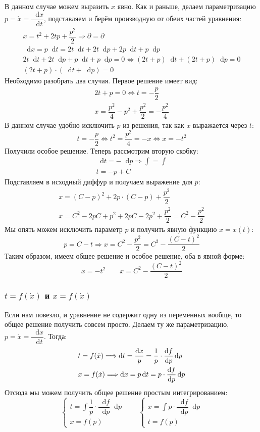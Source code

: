 \documentclass[a4paper,12pt]{article}
\renewcommand*\d{\mathop{}\!\mathrm{d}}
\newcommand{\dx}{\dot{x}}
\newcommand{\bto}{\Longrightarrow}
\newcommand{\ds}{\displaystyle}
\begin{document}
В данном случае можем выразить $x$ явно. Как и раньше, делаем параметризацию $p = \dx = \dfrac{\d x}{\d t}$, подставляем и берём производную от обеих частей уравнения:
\begin{gather*}
	x = t^2 + 2tp + \dfrac{p^2}{2} \bto \partial = \partial\\
	\d x = p\d t = 2t\d t + 2t\d p + 2p\d t + p\d p\\
	2t \d t + 2t\d p + p\d t + p\d p = 0 \iff (2t + p)\d t + (2t + p)\d p = 0\\
	(2t + p)\cdot (\d t + \d p) = 0
\end{gather*}
Необходимо разобрать два случая. Первое решение имеет вид:
\begin{gather*}
	2t + p = 0 \iff t = -\dfrac{p}{2}\\
	x = \dfrac{p^2}{4} - p^2 + \dfrac{p^2}{2} = -\dfrac{p^2}{4}
\end{gather*}
В данном случае удобно исключить $p$ из решения, так как $x$ выражается через $t$:
\[
	t = -\dfrac{p}{2} \iff t^2 = \dfrac{p^2}{4} = -x \iff x = -t^2
\]
Получили особое решение. Теперь рассмотрим вторую скобку:
\begin{gather*}
	\d t = -\d p \bto \ds\int = \int\\
	t = -p + C
\end{gather*}
Подставляем  в исходный диффур и получаем выражение для $p$:
\begin{gather*}
	x = (C - p)^2 + 2p \cdot (C - p) + \dfrac{p^2}{2}\\
	x = C^2 - 2pC + p^2 + 2pC - 2p^2 + \dfrac{p^2}{2} = C^2 - \dfrac{p^2}{2}
\end{gather*}
Мы опять можем исключить параметр $p$ и получить явную функцию $x = x(t)$:
\[
	p = C - t \bto x = C^2 - \dfrac{p^2}{2} = C^2 - \dfrac{(C - t)^2}{2}
\]
Таким образом, имеем общее решение и особое решение, оба в явной форме:
\[x = -t^2 \qquad x = C^2 - \dfrac{(C - t)^2}{2}\]


\subsubsection{$t = f(\dx)$ и $x = f(\dx)$}

Если нам повезло, и уравнение не содержит одну из переменных вообще, то общее решение получить совсем просто. Делаем ту же параметризацию, $p = \dx = \dfrac{\d x}{\d t}$. Тогда:
\[\begin{gathered}
	t = f(\dx) \bto \d t = \dfrac{\d x}{p} = \dfrac{1}{p} \cdot \dfrac{\d f}{\d p} \d p\hfill\\
	x = f(\dx) \bto \d x = p\d t = p \cdot \dfrac{\d f}{\d p} \d p\hfill
\end{gathered}\]
Отсюда мы можем получить общее решение простым интегрированием:
\[\begin{cases}
	t = \ds\int \dfrac{1}{p} \cdot \dfrac{\d f}{\d p} \d p\\
	x = f(p)
\end{cases}\qquad \begin{cases}
	x = \ds\int p \cdot \dfrac{\d f}{\d p} \d p\\
	t = f(p)
\end{cases}\]
\end{document}
